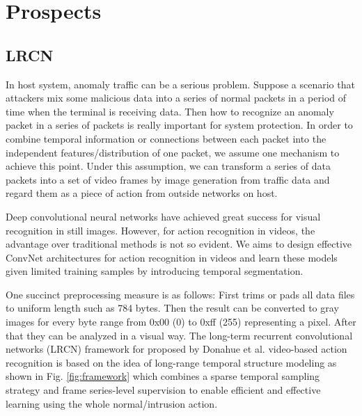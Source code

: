 \documentclass[conference]{IEEEtran}
\begin{document}
\section{Prospects}



\subsection{LRCN}


In host system, anomaly traffic can be a serious problem. Suppose a scenario that attackers mix some malicious data into a series of normal packets in a period of time when the terminal is receiving data. Then how to recognize an anomaly packet in a series of packets is really important for system protection. In order to combine temporal information or connections between each packet into the independent features/distribution of one packet, we assume one mechanism to achieve this point. Under this assumption, we can transform a series of data packets into a set of video frames by image generation from traffic data and regard them as a piece of action from outside networks on host.

Deep convolutional neural networks have achieved great success for visual recognition in still images. However, for action recognition in videos, the advantage over traditional methods is not so evident. We aims to design effective ConvNet architectures for action recognition in videos and learn these models given limited training samples by introducing temporal segmentation. 

One succinct preprocessing measure is as follows: First trims or pads all data files to uniform length such as 784 bytes. Then the result can be converted to gray images for every byte range from 0x00 (0) to 0xff (255) representing a pixel. After that they can be analyzed in a visual way. The long-term recurrent convolutional networks (LRCN) framework for proposed by Donahue et al. \cite{donahue2015long} video-based action recognition is based on the idea of long-range temporal structure modeling as shown in Fig. \ref{fig:framework} which combines a sparse temporal sampling strategy and frame series-level supervision to enable efficient and effective learning using the whole normal/intrusion action.
\end{document}
